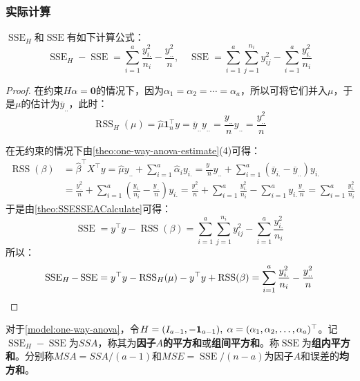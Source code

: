 \subsubsection{实际计算}
\begin{theorem}\label{theo:SSESSEACalculateAOV}
	$\operatorname{SSE}_H$和$\operatorname{SSE}$有如下计算公式：
	\begin{equation*}
		\operatorname{SSE}_H-\operatorname{SSE}=\sum_{i=1}^{a}\frac{y_{i.}^2}{n_i}-\frac{y_{..}^2}{n},\quad \operatorname{SSE}=\sum_{i=1}^{a}\sum_{j=1}^{n_i}y_{ij}^2-\sum_{i=1}^{a}\frac{y_{i.}^2}{n_i}
	\end{equation*}
\end{theorem}
\begin{proof}
	在约束$H\alpha=\mathbf{0}$的情况下，因为$\alpha_1=\alpha_2=\cdots=\alpha_a$，所以可将它们并入$\mu$，于是$\mu$的估计为$\overline{y}_{..}$，此时：
	\begin{equation*}
		\operatorname{RSS}_H(\mu)=\hat{\mu}\mathbf{1}_n^{\top}y=\overline{y}_{..}y_{..}=\frac{y_{..}}{n}y_{..}=\frac{y_{..}^2}{n}
	\end{equation*}\par
	在无约束的情况下由\cref{theo:one-way-anova-estimate}(4)可得：
	\begin{align*}
		\operatorname{RSS}(\beta)&=\hat{\beta}^{\top}X^{\top}y=\hat{\mu}y_{..}+\sum_{i=1}^{a}\hat{\alpha}_iy_{i.} =\frac{y_{..}}{n}y_{..}+\sum_{i=1}^{a}(\overline{y}_{i.}-\overline{y}_{..})y_{i.} \\
		&=\frac{y_{..}^2}{n}+\sum_{i=1}^{a}\left(\frac{y_{i.}}{n_i}-\frac{y_{..}}{n}\right)y_{i.} =\frac{y_{..}^2}{n}+\sum_{i=1}^{a}\frac{y_{i.}^2}{n_i}-\sum_{i=1}^{a}y_{i.}\frac{y_{..}}{n}=\sum_{i=1}^{a}\frac{y_{i.}^2}{n_i}
	\end{align*}
	于是由\cref{theo:SSESSEACalculate}可得：
	\begin{equation*}
		\operatorname{SSE}=y^{\top}y-\operatorname{RSS}(\beta)=\sum_{i=1}^{a}\sum_{j=1}^{n_i}y_{ij}^2-\sum_{i=1}^{a}\frac{y_{i.}^2}{n_i}
	\end{equation*}
	所以：
	\begin{align*}
		\operatorname{SSE}_H-\operatorname{SSE}=y^{\top}y-\operatorname{RSS}_H(\mu)-y^{\top}y+\operatorname{RSS}(\beta)=\sum_{i=1}^{a}\frac{y_{i.}^2}{n_i}-\frac{y_{..}^2}{n}\qedhere
	\end{align*}
\end{proof}
\begin{definition}
	对于\cref{model:one-way-anova}，令$H=(I_{a-1},-\mathbf{1}_{a-1}),\;\alpha=(\alpha_1, \alpha_2, \dots, \alpha_{a})^{\top}$。记$\operatorname{SSE}_H-\operatorname{SSE}$为$SSA$，称其为\textbf{因子$A$的平方和}或\textbf{组间平方和}。称$\operatorname{SSE}$为\textbf{组内平方和}。分别称$MSA=SSA/(a-1)$和$MSE=\operatorname{SSE}/(n-a)$为因子$A$和误差的\textbf{均方和}。
\end{definition}
